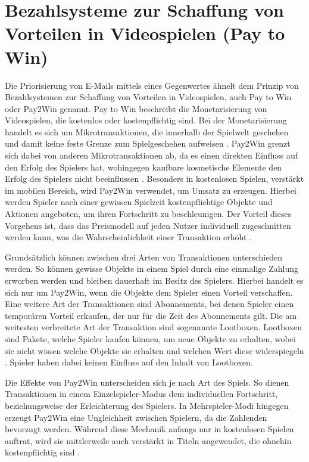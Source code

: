 
\section{Bezahlsysteme zur Schaffung von Vorteilen in Videospielen (Pay to Win)}
\label{Bezahlsysteme_zur_Schaffung_von_Vorteilen_in_Videospielen_(Pay_to_Win)}

Die Priorisierung von E-Mails mittels eines Gegenwertes ähnelt dem Prinzip von Bezahlsystemen zur Schaffung von Vorteilen in Videospielen, auch Pay to Win oder Pay2Win genannt. Pay to Win beschreibt die Monetarisierung von Videospielen, die kostenlos oder kostenpflichtig sind. Bei der Monetarisierung handelt es sich um Mikrotransaktionen, die innerhalb der Spielwelt geschehen und damit keine feste Grenze zum Spielgeschehen aufweisen \citep[S. 18]{Tomic2019}. Pay2Win grenzt sich dabei von anderen Mikrotransaktionen ab, da es einen direkten Einfluss auf den Erfolg des Spielers hat, wohingegen kaufbare kosmetische Elemente den Erfolg des Spielers nicht beeinflussen \citep[S. 124 f.]{Reza2019}. Besonders in kostenlosen Spielen, verstärkt im mobilen Bereich, wird Pay2Win verwendet, um Umsatz zu erzeugen. Hierbei werden Spieler nach einer gewissen Spielzeit kostenpflichtige Objekte und Aktionen angeboten, um ihren Fortschritt zu beschleunigen. Der Vorteil dieses Vorgehens ist, dass das Preismodell auf jeden Nutzer individuell zugeschnitten werden kann, was die Wahrscheinlichkeit einer Transaktion erhöht \citep[S. 2]{Alha2014}.

Grundsätzlich können zwischen drei Arten von Transaktionen unterschieden werden. So können gewisse Objekte in einem Spiel durch eine einmalige Zahlung erworben werden und bleiben dauerhaft im Besitz des Spielers. Hierbei handelt es sich nur um Pay2Win, wenn die Objekte dem Spieler einen Vorteil verschaffen. Eine weitere Art der Transaktionen sind Abonnements, bei denen Spieler einen temporären Vorteil erkaufen, der nur für die Zeit des Abonnements gilt. Die am weitesten verbreitete Art der Transaktion sind sogenannte Lootboxen. Lootboxen sind Pakete, welche Spieler kaufen können, um neue Objekte zu erhalten, wobei sie nicht wissen welche Objekte sie erhalten und welchen Wert diese widerspiegeln \citep[S. 20]{Tomic2019}. Spieler haben dabei keinen Einfluss auf den Inhalt von Lootboxen.

Die Effekte von Pay2Win unterscheiden sich je nach Art des Spiels. So dienen Transaktionen in einem Einzelspieler-Modus dem individuellen Fortschritt, beziehungsweise der Erleichterung des Spielers. In Mehrspieler-Modi hingegen erzeugt Pay2Win eine Ungleichheit zwischen Spielern, da die Zahlenden bevorzugt werden. Während diese Mechanik anfangs nur in kostenlosen Spielen auftrat, wird sie mittlerweile auch verstärkt in Titeln angewendet, die ohnehin kostenpflichtig sind \citep[S. 19]{Tomic2019}.

